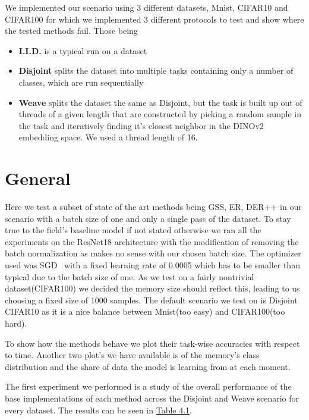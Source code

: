 \documentclass[oneside]{ctuthesis}
\begin{document}
We implemented our scenario using 3 different datasets, Mnist, CIFAR10 and CIFAR100 for which we implemented 3 different protocols to test and show where the tested methods fail.
Those being
\begin{itemize}
    \item \textbf{I.I.D.} is a typical run on a dataset
    \item \textbf{Disjoint} splits the dataset into multiple tasks containing only a number of classes, which are run sequentially
    \item \textbf{Weave} splits the dataset the same as Disjoint, but the task is built up out of threads of a given length that are constructed by picking a random sample in the task and iteratively finding it's closest neighbor in the DINOv2~\cite{DINOv2} embedding space. We used a thread length of 16.
\end{itemize}

\section{General}
Here we test a subset of state of the art methods being GSS, ER, DER++ in our scenario with a batch size of one and only a single pass of the dataset. To stay true to the field's baseline model if not stated otherwise we ran all the experiments on the ResNet18 architecture with the modification of removing the batch normalization as makes no sense with our chosen batch size. The optimizer used was SGD~\cite{SGD} with a fixed learning rate of 0.0005 which has to be smaller than typical due to the batch size of one. As we test on a fairly nontrivial dataset(CIFAR100) we decided the memory size should reflect this, leading to us choosing a fixed size of 1000 samples. The default scenario we test on is Disjoint CIFAR10 as it is a nice balance between Mnist(too easy) and CIFAR100(too hard).

To show how the methods behave we plot their task-wise accuracies with respect to time. Another two plot's we have available is of the memory's class distribution and the share of data the model is learning from at each moment. 

The first experiment we performed is a study of the overall performance of the base implementations of each method across the Disjoint and Weave scenario for every dataset. The results can be seen in \hyperref[tab:overall_accuracy]{Table 4.1}. 
\end{document}
